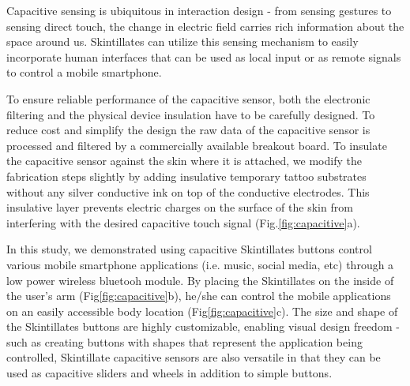 \documentclass{sigchi}
\begin{document}
Capacitive sensing is ubiquitous in interaction design - from sensing gestures to sensing direct touch, the change in electric field carries rich information about the space around us. Skintillates can utilize this sensing mechanism to easily incorporate human interfaces that can be used as local input or as remote signals to control a mobile smartphone.

To ensure reliable performance of the capacitive sensor, both the electronic filtering and the physical device insulation have to be carefully designed. To reduce cost and simplify the design the raw data of the capacitive sensor is processed and filtered by a commercially available breakout board\footnotemark[1]. To insulate the capacitive sensor against the skin where it is attached, we modify the fabrication steps slightly by adding insulative temporary tattoo substrates without any silver conductive ink on top of the conductive electrodes. This insulative layer prevents electric charges on the surface of the skin from interfering with the desired capacitive touch signal (Fig.\ref{fig:capacitive}a). 

In this study, we demonstrated using capacitive Skintillates buttons control various mobile smartphone applications (i.e. music, social media, etc) through a low power wireless bluetooh module\footnotemark[2]. By placing the Skintillates on the inside of the user’s arm (Fig\ref{fig:capacitive}b), he/she can control the mobile applications on an easily accessible body location (Fig\ref{fig:capacitive}c). The size and shape of the Skintillates buttons are highly customizable, enabling visual design freedom - such as creating buttons with shapes that represent the application being controlled, Skintillate capacitive sensors are also versatile in that they can be used  as capacitive sliders and wheels in addition to simple buttons.

\end{document}
